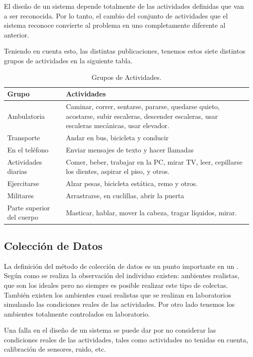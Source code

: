 \label{sec22:actividades-humanas} El diseño de un sistema 
depende totalmente de las actividades definidas que van a ser reconocida.
Por lo tanto, el cambio del conjunto de actividades que el sistema
reconoce convierte al problema en uno completamente diferente al anterior.

Teniendo en cuenta esto, las distintas publicaciones, tenemos estos
siete distintos grupos de actividades en la siguiente tabla.

\begin{table}[htbp]
\centering{}%
\begin{tabular}{|l|p{9cm}|}
\hline 
\textbf{Grupo}  & \textbf{Actividades} \tabularnewline
\hline 
\hline 
Ambulatoria  & Caminar, correr, sentarse, pararse, quedarse quieto, acostarse, subir
escaleras, descender escaleras, usar escaleras mecánicas, usar elevador.\tabularnewline
\hline 
Transporte  & Andar en bus, bicicleta y conducir \tabularnewline
\hline 
En el teléfono  & Enviar mensajes de texto y hacer llamadas \tabularnewline
\hline 
Actividades diarias  & Comer, beber, trabajar en la PC, mirar TV, leer, cepillarse los dientes,
aspirar el piso, y otros. \tabularnewline
\hline 
Ejercitarse  & Alzar pesas, bicicleta estática, remo y otros. \tabularnewline
\hline 
Militares  & Arrastrarse, en cuclillas, abrir la puerta \tabularnewline
\hline 
Parte superior del cuerpo  & Masticar, hablar, mover la cabeza, tragar líquidos, mirar. \tabularnewline
\hline 
\end{tabular}\caption{Grupos de Actividades.}
\label{tabla:sencilla} 
\end{table}


\subsection{Colección de Datos}

La definición del método de colección de datos es un punto importante
en un . Según como se realiza la observación del individuo
existen: ambientes realistas, que son los ideales pero no siempre
es posible realizar este tipo de colectas. También existen los ambientes
cuasi realistas que se realizan en laboratorios simulando las condiciones
reales de las actividades. Por otro lado tenemos los ambientes totalmente
controlados en laboratorio.

Una falla en el diseño de un sistema  se puede dar por
no considerar las condiciones reales de las actividades, tales como
actividades no tenidas en cuenta, calibración de sensores, ruido,
etc.

